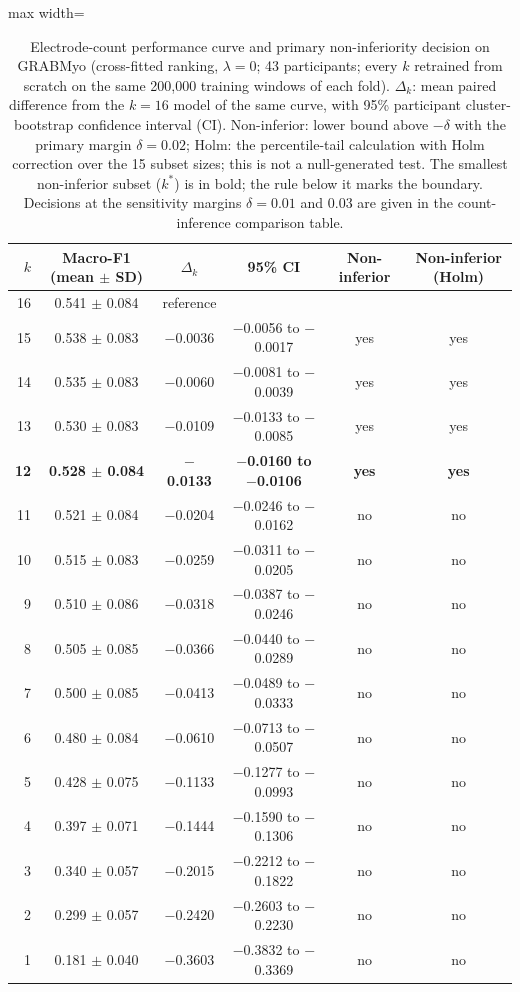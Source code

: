 \begin{table}[htbp]
\centering
\small
\caption{Electrode-count performance curve and primary non-inferiority decision on GRABMyo (cross-fitted ranking, $\lambda = 0$; 43 participants; every $k$ retrained from scratch on the same 200,000 training windows of each fold). $\Delta_k$: mean paired difference from the $k = 16$ model of the same curve, with 95\% participant cluster-bootstrap confidence interval (CI). Non-inferior: lower bound above $-\delta$ with the primary margin $\delta = 0.02$; Holm: the percentile-tail calculation with Holm correction over the 15 subset sizes; this is not a null-generated test. The smallest non-inferior subset ($k^*$) is in bold; the rule below it marks the boundary. Decisions at the sensitivity margins $\delta = 0.01$ and 0.03 are given in the count-inference comparison table.}
\label{tab:sparse_ni}
\setlength{\tabcolsep}{4pt}
\begin{adjustbox}{max width=\textwidth}
\begin{tabular}{rccccc}
\toprule
$k$ & Macro-F1 (mean $\pm$ SD) & $\Delta_k$ & 95\% CI & Non-inferior & Non-inferior (Holm) \\
\midrule
16 & 0.541 $\pm$ 0.084 & reference &  &  &  \\
15 & 0.538 $\pm$ 0.083 & $-$0.0036 & $-$0.0056 to $-$0.0017 & yes & yes \\
14 & 0.535 $\pm$ 0.083 & $-$0.0060 & $-$0.0081 to $-$0.0039 & yes & yes \\
13 & 0.530 $\pm$ 0.083 & $-$0.0109 & $-$0.0133 to $-$0.0085 & yes & yes \\
\textbf{12} & \textbf{0.528 $\pm$ 0.084} & \textbf{$-$0.0133} & \textbf{$-$0.0160 to $-$0.0106} & \textbf{yes} & \textbf{yes} \\
\midrule 11 & 0.521 $\pm$ 0.084 & $-$0.0204 & $-$0.0246 to $-$0.0162 & no & no \\
10 & 0.515 $\pm$ 0.083 & $-$0.0259 & $-$0.0311 to $-$0.0205 & no & no \\
9 & 0.510 $\pm$ 0.086 & $-$0.0318 & $-$0.0387 to $-$0.0246 & no & no \\
8 & 0.505 $\pm$ 0.085 & $-$0.0366 & $-$0.0440 to $-$0.0289 & no & no \\
7 & 0.500 $\pm$ 0.085 & $-$0.0413 & $-$0.0489 to $-$0.0333 & no & no \\
6 & 0.480 $\pm$ 0.084 & $-$0.0610 & $-$0.0713 to $-$0.0507 & no & no \\
5 & 0.428 $\pm$ 0.075 & $-$0.1133 & $-$0.1277 to $-$0.0993 & no & no \\
4 & 0.397 $\pm$ 0.071 & $-$0.1444 & $-$0.1590 to $-$0.1306 & no & no \\
3 & 0.340 $\pm$ 0.057 & $-$0.2015 & $-$0.2212 to $-$0.1822 & no & no \\
2 & 0.299 $\pm$ 0.057 & $-$0.2420 & $-$0.2603 to $-$0.2230 & no & no \\
1 & 0.181 $\pm$ 0.040 & $-$0.3603 & $-$0.3832 to $-$0.3369 & no & no \\
\bottomrule
\end{tabular}
\end{adjustbox}
\end{table}
